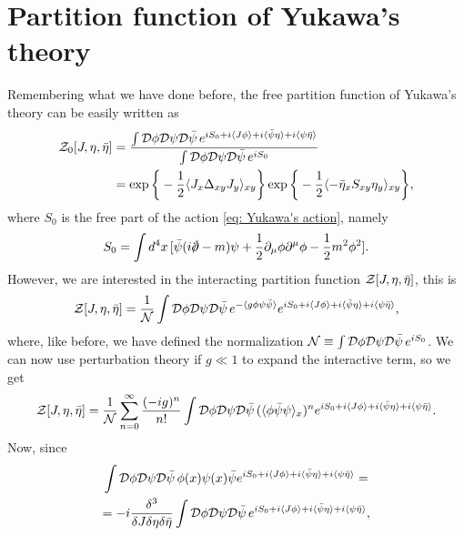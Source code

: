 \section{Partition function of Yukawa's theory}
Remembering what we have done before, the free partition function of Yukawa's theory can be easily written as 
\begin{equation}
    \begin{split}
        \mathcal{Z}_0[J,\eta,\bar{\eta}] &= \frac{\int \mathcal{D}\phi\mathcal{D}\psi\mathcal{D}\bar{\psi}\,e^{iS_0 + i\langle J\phi \rangle + i\langle \bar{\psi}\eta \rangle + i\langle \psi\bar{\eta} \rangle}}{\int \mathcal{D}\phi\mathcal{D}\psi\mathcal{D}\bar{\psi}\,e^{iS_0}} \\
        &= \exp{\bigg\{-\frac{1}{2}\langle J_x\Delta_{xy}J_y \rangle_{xy}\bigg\}}\exp{\bigg\{-\frac{1}{2}\langle -\bar{\eta}_xS_{xy}\eta_y \rangle_{xy}\bigg\}},
    \end{split}
\end{equation}
where $S_0$ is the free part of the action \eqref{eq: Yukawa's action}, namely 
\begin{equation}
    S_0 = \int d^4x\,[\b{\psi}(i\sl{\p} - m)\psi + \frac{1}{2}\p_\mu\phi\p^\mu\phi - \frac{1}{2}m^2\phi^2].
\end{equation}
However, we are interested in the interacting partition function $\mathcal{Z}[J,\eta,\bar{\eta}]$, this is 
\begin{equation}
    \mathcal{Z}[J,\eta,\bar{\eta}] = \frac{1}{\mathcal{N}}\int \mathcal{D}\phi\mathcal{D}\psi\mathcal{D}\bar{\psi}\,e^{-\langle g\phi\psi\bar{\psi} \rangle}e^{iS_0 + i\langle J\phi \rangle + i\langle \bar{\psi}\eta \rangle + i\langle \psi\bar{\eta} \rangle},
\end{equation}
where, like before, we have defined the normalization $\mathcal{N} \equiv \int \mathcal{D}\phi\mathcal{D}\psi\mathcal{D}\bar{\psi}\,e^{iS_0}$. We can now use perturbation theory if $g \ll 1$ to expand the interactive term, so we get 
\begin{equation}
    \mathcal{Z}[J,\eta,\bar{\eta}] = \frac{1}{\mathcal{N}}\sum_{n=0}^\infty\frac{(-ig)^n}{n!}\int \mathcal{D}\phi\mathcal{D}\psi\mathcal{D}\bar{\psi}\,(\langle \phi\bar{\psi}\psi \rangle_x)^ne^{iS_0 + i\langle J\phi \rangle + i\langle \bar{\psi}\eta \rangle + i\langle \psi\bar{\eta} \rangle}.
\end{equation}
Now, since 
\begin{multline}
    \int \mathcal{D}\phi\mathcal{D}\psi\mathcal{D}\bar{\psi}\,\phi(x)\psi(x)\bar{\psi}e^{iS_0 + i\langle J\phi \rangle + i\langle \bar{\psi}\eta \rangle + i\langle \psi\bar{\eta} \rangle} = \\ 
    = -i\frac{\delta^3}{\delta J\delta\eta\delta\bar{\eta}}\int \mathcal{D}\phi\mathcal{D}\psi\mathcal{D}\bar{\psi}\,e^{iS_0 + i\langle J\phi \rangle + i\langle \bar{\psi}\eta \rangle + i\langle \psi\bar{\eta} \rangle},
\end{multline}
